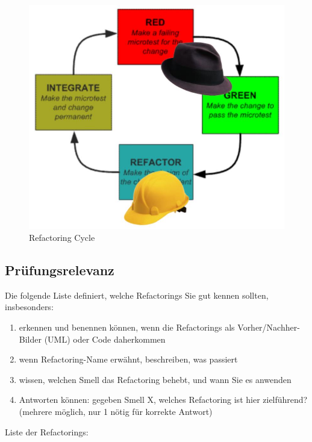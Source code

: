 \begin{figure}[h]
	\centering
	\includegraphics[width=0.6\linewidth]{img/refactoring_cycle}
	\caption{Refactoring Cycle}
	\label{fig:refactoringcycle}
\end{figure}

\subsection{Prüfungsrelevanz}

Die folgende Liste definiert, welche Refactorings Sie gut kennen sollten, insbesonders:

\begin{enumerate}
	\item erkennen und benennen können, wenn die Refactorings als Vorher/Nachher-Bilder (UML) oder Code daherkommen
	\item wenn Refactoring-Name erwähnt, beschreiben, was passiert
	\item wissen, welchen Smell das Refactoring behebt, und wann Sie es anwenden
	\item Antworten können: gegeben Smell X, welches Refactoring ist hier zielführend? (mehrere möglich, nur 1 nötig für korrekte Antwort)
\end{enumerate}

Liste der Refactorings:

